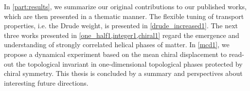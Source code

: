 In \cref{part:results}, we summarize our original contributions to our published works, which are then presented in a thematic manner.
The flexible tuning of transport properties, i.e. the Drude weight, is presented in \cref{drude_increased1}.
The next three works presented in \cref{one_half1,integer1,chiral1} regard the emergence and understanding of strongly correlated helical phases of matter.
In \cref{mcd1}, we propose a dynamical experiment based on the mean chiral displacement to read-out the topological invariant in one-dimensional topological phases protected by chiral symmetry.
This thesis is concluded by a summary and perspectives about interesting future directions.
